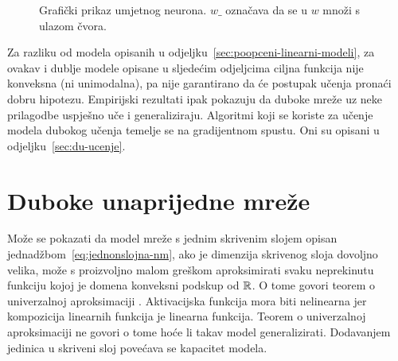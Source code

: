\documentclass[utf8, diplomski, lmodern]{fer}
\begin{document}
\begin{figure}
	\centering
	\caption{Grafički prikaz umjetnog neurona. $w\_$ označava da se u $w$ množi s ulazom čvora.}
	\label{fig:umjetni-neuron}
\end{figure}

Za razliku od modela opisanih u odjeljku~\ref{sec:poopceni-linearni-modeli}, za ovakav i dublje modele opisane u sljedećim odjeljcima ciljna funkcija nije konveksna (ni unimodalna), pa nije garantirano da će postupak učenja pronaći dobru hipotezu. Empirijski rezultati ipak pokazuju da duboke mreže uz neke prilagodbe uspješno uče i generaliziraju. Algoritmi koji se koriste za učenje modela dubokog učenja temelje se na gradijentnom spustu. Oni su opisani u odjeljku~\ref{sec:du-ucenje}.


\section{Duboke unaprijedne mreže}

Može se pokazati da model mreže s jednim skrivenim slojem opisan jednadžbom~\eqref{eq:jednonslojna-nm}, ako je dimenzija skrivenog sloja dovoljno velika, može s proizvoljno malom greškom aproksimirati svaku neprekinutu funkciju kojoj je domena konveksni podskup od $\mathbb{R}$. O tome govori teorem o univerzalnoj aproksimaciji \citep{Cybenko:ASSF:1989,Leshno:1993:MFFNWNPA}. Aktivacijska funkcija mora biti nelinearna jer kompozicija linearnih funkcija je linearna funkcija. Teorem o univerzalnoj aproksimaciji ne govori o tome hoće li takav model generalizirati. Dodavanjem jedinica u skriveni sloj povećava se kapacitet modela.
\end{document}
